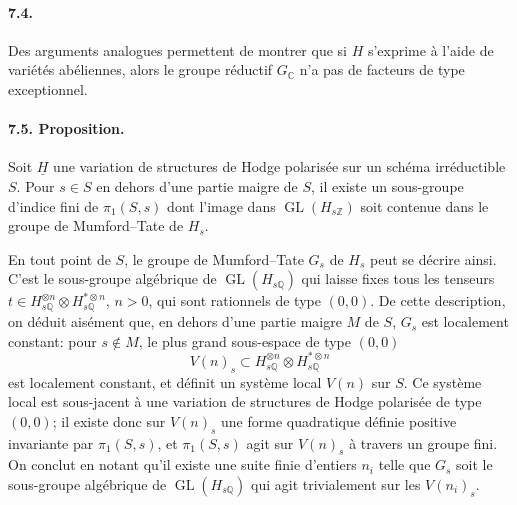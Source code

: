 \documentclass[10pt]{article}
\newcommand{\C}{\mathbb{C}}
\newcommand{\Q}{\mathbb{Q}}
\newcommand{\Z}{\mathbb{Z}}
\newcommand{\GL}{\operatorname{GL}}
\begin{document}
\paragraph{7.4.} Des arguments analogues permettent de montrer que si $H$ s'exprime à l'aide de variétés abéliennes, alors le groupe réductif $G_\C$ n'a pas de facteurs de type exceptionnel.

\paragraph{7.5. Proposition.} Soit $\underline H$ une variation de structures de Hodge polarisée sur un schéma irréductible $S$. Pour $s\in S$ en dehors d'une partie maigre de $S$, il existe un sous-groupe d'indice fini de $\pi_1(S,s)$ dont l'image dans $\GL(H_{s\Z})$ soit contenue dans le groupe de Mumford--Tate de $H_s$.

En tout point de $S$, le groupe de Mumford--Tate $G_s$ de $H_s$ peut se décrire ainsi. C'est le sous-groupe algébrique de $\GL(H_{s\Q})$ qui laisse fixes tous les tenseurs $t\in H_{s\Q}^{\otimes n}\otimes H_{s\Q}^{*\otimes n}$, $n>0$, qui sont rationnels de type $(0,0)$. De cette description, on déduit aisément que, en dehors d'une partie maigre $M$ de $S$, $G_s$ est localement constant: pour $s\notin M$, le plus grand sous-espace de type $(0,0)$
\[
V(n)_s\subset H_{s\Q}^{\otimes n}\otimes H_{s\Q}^{*\otimes n}
\]
est localement constant, et définit un système local $V(n)$ sur $S$. Ce système local est sous-jacent à une variation de structures de Hodge polarisée de type $(0,0)$; il existe donc sur $V(n)_s$ une forme quadratique définie positive invariante par $\pi_1(S,s)$, et $\pi_1(S,s)$ agit sur $V(n)_s$ à travers un groupe fini. On conclut en notant qu'il existe une suite finie d'entiers $n_i$ telle que $G_s$ soit le sous-groupe algébrique de $\GL(H_{s\Q})$ qui agit trivialement sur les $V(n_i)_s$.
\end{document}
